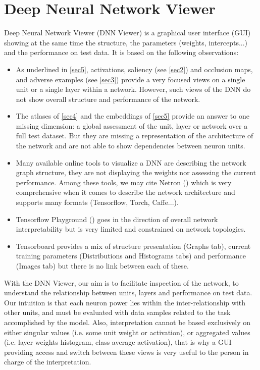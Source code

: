 \newpage

\section{Deep Neural Network Viewer}
\label{sec-dnnviewer}

Deep Neural Network Viewer (DNN Viewer) is a graphical user interface (GUI) showing at the same time the structure, the parameters (weights, intercepts...) and the performance on test data. It is based on the following observations:
 \begin{itemize}
     \item As underlined in \ref{sec5}, activations, saliency (see \ref{sec2}) and occlusion maps, and adverse examples (see \ref{sec3}) provide a very focused views on a single unit or a single layer within a network. However, such views of the DNN do not show overall structure and performance of the network.
     \item The atlases of \ref{sec4} and the embeddings of \ref{sec5} provide an answer to one missing dimension: a global assessment of the unit, layer or network over a full test dataset. But they are missing a representation of the architecture of the network and are not able to show dependencies between neuron units. 
     \item Many available online tools to visualize a DNN are describing the network graph structure, they are not displaying the weights nor assessing the current performance. Among these tools, we may cite Netron (\cite{roeder2020}) which is very comprehensive when it comes to describe the network architecture and supports many formats (Tensorflow, Torch, Caffe...). 
     \item Tensorflow Playground (\cite{tf-playground2020}) goes in the direction of overall network interpretability but is very limited and constrained on network topologies.
     \item Tensorboard provides a mix of structure presentation (Graphs tab), current training parameters (Distributions and Histograms tabs) and performance (Images tab) but there is no link between each of these.
 \end{itemize}

With the DNN Viewer, our aim is to facilitate inspection of the network, to understand the relationship between units, layers and performance on test data. Our intuition is that each neuron power lies within the inter-relationship with other units, and must be evaluated with data samples related to the task accomplished by the model. Also, interpretation cannot be based exclusively on either singular values (i.e. some unit weight or activation), or aggregated values (i.e. layer weights histogram, class average activation), that is why a GUI providing access and switch between these views is very useful to the person in charge of the interpretation.


